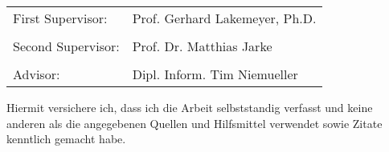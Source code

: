 \newpage
\Large
\begin{tabular}{ l l }
First Supervisor: & Prof. Gerhard Lakemeyer, Ph.D.\\
\\
Second Supervisor: & Prof. Dr. Matthias Jarke\\
\\
Advisor: &  Dipl. Inform. Tim Niemueller\\
\end{tabular}

\vspace{7cm}
Hiermit versichere ich, dass ich die Arbeit selbststandig verfasst und keine anderen als die angegebenen Quellen und Hilfsmittel verwendet sowie Zitate kenntlich gemacht habe.\\

\vspace{3cm}

\large
\makebox[2.5in]{\hrulefill} \hspace {1.0in} \makebox[2.5in]{\hrulefill} \\
 \hspace {1.0in}  \\
\normalsize

